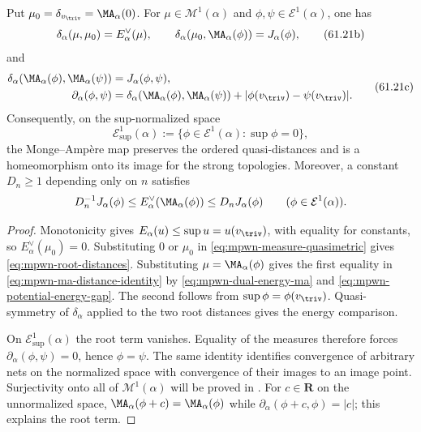 \noindent\begin{minipage}{\linewidth}
\begin{proposition}\label{prop:mpwn-ordered-ma-distances}
Put $\mu_0=\delta_{v_{\triv}}=\MA_\alpha(0)$. For $\mu\in\mathcal M^1(\alpha)$ and $\phi,\psi\in\mathcal E^1(\alpha)$, one has
\[
 \delta_\alpha(\mu,\mu_0)=E_\alpha^\vee(\mu),
 \qquad
 \delta_\alpha(\mu_0,\MA_\alpha(\phi))=J_\alpha(\phi),
\tag{61.21b}\label{eq:mpwn-root-distances}
\]
and
\[
 \begin{aligned}
 \delta_\alpha(\MA_\alpha(\phi),\MA_\alpha(\psi))
     &=J_\alpha(\phi,\psi),\\
 \partial_\alpha(\phi,\psi)
     &=\delta_\alpha(\MA_\alpha(\phi),\MA_\alpha(\psi))
       +|\phi(v_{\triv})-\psi(v_{\triv})|.
 \end{aligned}
\tag{61.21c}\label{eq:mpwn-ma-distance-identity}
\]
Consequently, on the sup-normalized space
\[
 \mathcal E^1_{\sup}(\alpha)
       :=\{\phi\in\mathcal E^1(\alpha):\sup\phi=0\},
\]
the Monge--Amp\`ere map preserves the ordered quasi-distances and is a homeomorphism onto its image for the strong topologies. Moreover, a constant $D_n\geq1$ depending only on $n$ satisfies
\[
 D_n^{-1}J_\alpha(\phi)
       \leq E_\alpha^\vee(\MA_\alpha(\phi))
       \leq D_nJ_\alpha(\phi)
       \qquad(\phi\in\mathcal E^1(\alpha)).
\]
\end{proposition}
\end{minipage}\par

\begin{proof}
Monotonicity gives $E_\alpha(u)\leq\sup u=u(v_{\triv})$, with equality for constants, so $E_\alpha^\vee(\mu_0)=0$. Substituting $0$ or $\mu_0$ in \eqref{eq:mpwn-measure-quasimetric} gives \eqref{eq:mpwn-root-distances}. Substituting $\mu=\MA_\alpha(\phi)$ gives the first equality in \eqref{eq:mpwn-ma-distance-identity} by \eqref{eq:mpwn-dual-energy-ma} and \eqref{eq:mpwn-potential-energy-gap}. The second follows from $\sup\phi=\phi(v_{\triv})$. Quasi-symmetry of $\delta_\alpha$ applied to the two root distances gives the energy comparison.

On $\mathcal E^1_{\sup}(\alpha)$ the root term vanishes. Equality of the measures therefore forces $\partial_\alpha(\phi,\psi)=0$, hence $\phi=\psi$. The same identity identifies convergence of arbitrary nets on the normalized space with convergence of their images to an image point. Surjectivity onto all of $\mathcal M^1(\alpha)$ will be proved in . For $c\in\mathbf R$ on the unnormalized space, $\MA_\alpha(\phi+c)=\MA_\alpha(\phi)$ while $\partial_\alpha(\phi+c,\phi)=|c|$; this explains the root term.
\end{proof}

